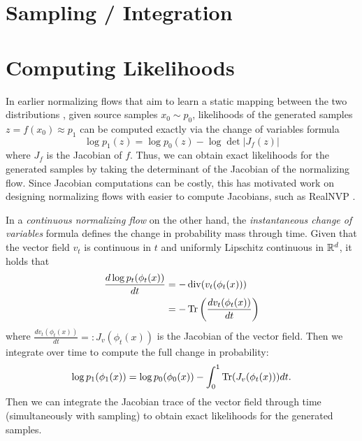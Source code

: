 \section{Sampling / Integration} \label{section:sampling_integration}

\section{Computing Likelihoods} \label{section:computing_likelihoods}

In earlier normalizing flows that aim to learn a static mapping between the two distributions \citep{rezendeVariationalInferenceNormalizing2015}, given source samples $x_0 \sim p_0$, likelihoods of the generated samples $z = f(x_0) \approx p_1$  can be computed exactly via the change of variables formula
\begin{equation} \label{eq:static_cov}
    \log p_1(z) = \log p_0(z) - \log \det \left\vert J_f(z) \right\vert
\end{equation}
where $J_f$ is the Jacobian of $f$. Thus, we can obtain exact likelihoods for the generated samples by taking the determinant of the Jacobian of the normalizing flow. Since Jacobian computations can be costly, this has motivated work on designing normalizing flows with easier to compute Jacobians, such as RealNVP \citep{dinhDensityEstimationUsing2017}. 

In a \textit{continuous normalizing flow} on the other hand, the \textit{instantaneous change of variables} formula \citep{chenNeuralOrdinaryDifferential2018a} defines the change in probability mass through time. Given that the vector field $v_t$ is continuous in $t$ and uniformly Lipschitz continuous in $\mathbb{R}^d$, it holds that
\begin{align} \label{eq:continuous_cov}
    \frac{d \log p_t(\phi_t(x))}{dt} &= - \operatorname{div}(v_t(\phi_t(x))) \\
                                     &= - \operatorname{Tr} \left( \frac{d v_t(\phi_t(x))}{dt} \right)
\end{align}
where $\frac{d v_t(\phi_t(x))}{dt} =: J_v(\phi_t(x))$ is the Jacobian of the vector field. Then we integrate over time to compute the full change in probability:
\begin{equation} \label{eq:full_continuous_cov}
    \log p_1(\phi_1(x)) = \log p_0(\phi_0(x)) - \int_0^1 \operatorname{Tr}(J_v(\phi_t(x))) dt.
\end{equation}
Then we can integrate the Jacobian trace of the vector field through time (simultaneously with sampling) to obtain exact likelihoods for the generated samples. 

